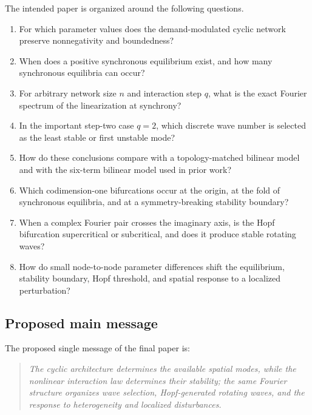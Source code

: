 \documentclass[11pt, reqno]{amsart}
\theoremstyle{definition}
\theoremstyle{remark}
\begin{document}
The intended paper is organized around the following questions.

\begin{enumerate}[label=\textup{Q\arabic*.},leftmargin=3em]
    \item For which parameter values does the demand-modulated cyclic network
    preserve nonnegativity and boundedness?

    \item When does a positive synchronous equilibrium exist, and how many
    synchronous equilibria can occur?

    \item For arbitrary network size $n$ and interaction step $q$, what is the
    exact Fourier spectrum of the linearization at synchrony?

    \item In the important step-two case $q=2$, which discrete wave number is
    selected as the least stable or first unstable mode?

    \item How do these conclusions compare with a topology-matched bilinear
    model and with the six-term bilinear model used in prior work?

    \item Which codimension-one bifurcations occur at the origin, at the fold
    of synchronous equilibria, and at a symmetry-breaking stability boundary?

    \item When a complex Fourier pair crosses the imaginary axis, is the Hopf
    bifurcation supercritical or subcritical, and does it produce stable
    rotating waves?

    \item How do small node-to-node parameter differences shift the
    equilibrium, stability boundary, Hopf threshold, and spatial response to a
    localized perturbation?
\end{enumerate}

\subsection{Proposed main message}

The proposed single message of the final paper is:

\begin{quote}
\emph{The cyclic architecture determines the available spatial modes, while
the nonlinear interaction law determines their stability; the same Fourier
structure organizes wave selection, Hopf-generated rotating waves, and the
response to heterogeneity and localized disturbances.}
\end{quote}
\end{document}
